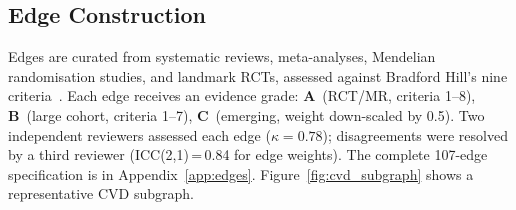 \documentclass[runningheads]{llncs}
\begin{document}
\subsection{Edge Construction}\label{sec:edges}

Edges are curated from systematic reviews, meta-analyses, Mendelian
randomisation studies, and landmark RCTs, assessed against
Bradford Hill's nine criteria~\cite{hill1965environment}.
Each edge receives an evidence grade:
\textbf{A}~(RCT/MR, criteria 1--8),
\textbf{B}~(large cohort, criteria 1--7),
\textbf{C}~(emerging, weight down-scaled by 0.5).
Two independent reviewers assessed each edge ($\kappa = 0.78$);
disagreements were resolved by a third reviewer
(ICC(2,1)\,=\,0.84 for edge weights).
The complete 107-edge specification is in
Appendix~\ref{app:edges}.
Figure~\ref{fig:cvd_subgraph} shows a representative CVD subgraph.
\end{document}
